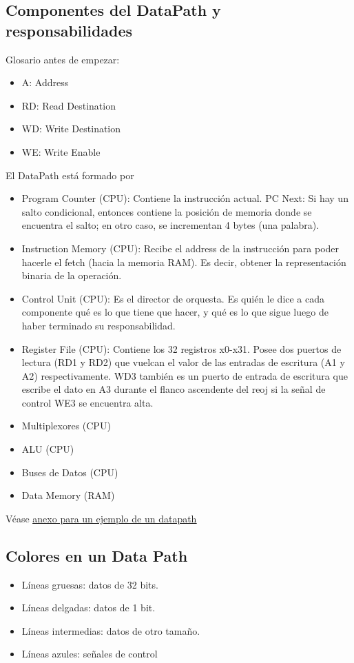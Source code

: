 \documentclass[10pt,a4paper]{article}
\begin{document}
\subsection*{Componentes del DataPath y responsabilidades}
Glosario antes de empezar: 
\begin{itemize}
    \item A: Address
    \item RD: Read Destination
    \item WD: Write Destination
    \item WE: Write Enable 
\end{itemize}
El DataPath está formado por
\begin{itemize}
    \item Program Counter (CPU): Contiene la instrucción actual. PC Next: Si hay un salto condicional, entonces contiene la posición de memoria donde se encuentra el salto; en otro caso, se incrementan 4 bytes (una palabra).
    \item Instruction Memory (CPU): Recibe el address de la instrucción para poder hacerle el fetch (hacia la memoria RAM). Es decir, obtener la representación binaria de la operación.
    \item Control Unit (CPU): Es el director de orquesta. Es quién le dice a cada componente qué es lo que tiene que hacer, y qué es lo que sigue luego de haber terminado su responsabilidad.
    \item Register File (CPU): Contiene los 32 registros x0-x31. Posee dos puertos de lectura (RD1 y RD2) que vuelcan el valor de las entradas de escritura (A1 y A2) respectivamente. WD3 también es un puerto de entrada de escritura que escribe el dato en A3 durante el flanco ascendente del reoj si la señal de control WE3 se encuentra alta.
    \item Multiplexores (CPU)
    \item ALU (CPU)
    \item Buses de Datos (CPU)
    \item Data Memory (RAM)
\end{itemize}
Véase \hyperref[subsec:datapath_example]{\underline{anexo para un ejemplo de un datapath}} 
\subsection*{Colores en un Data Path}
\begin{itemize}
    \item Líneas gruesas: datos de 32 bits.
    \item Líneas delgadas: datos de 1 bit.
    \item Líneas intermedias: datos de otro tamaño.
    \item Líneas azules: señales de control 
\end{itemize}
\end{document}
